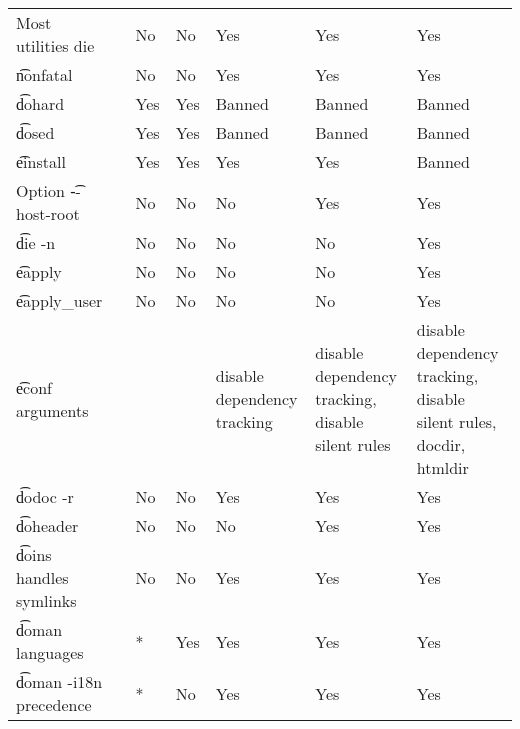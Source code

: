 \begin{landscape}
\begin{longtable}{llP{7.5em}P{7.5em}P{7.5em}P{7.5em}P{7.5em}}
Most utilities die &  &
    No & No & Yes & Yes & Yes \\

\t{nonfatal} &  &
    No & No & Yes & Yes & Yes \\

\t{dohard} &  &
    Yes & Yes & Banned & Banned & Banned \\

\t{dosed} &  &
    Yes & Yes & Banned & Banned & Banned \\

\t{einstall} &  &
    Yes & Yes & Yes & Yes & Banned \\

Option \t{-{}-host-root} &  &
    No & No & No & Yes & Yes \\

\t{die -n} &  &
    No & No & No & No & Yes \\

\t{eapply} &  &
    No & No & No & No & Yes \\

\t{eapply\_user} &  &
    No & No & No & No & Yes \\

\t{econf} arguments &  &
    &  & disable dependency tracking &
    disable dependency tracking, disable silent rules &
    disable dependency tracking, disable silent rules, docdir, htmldir \\

\t{dodoc -r} &  &
    No & No & Yes & Yes & Yes \\

\t{doheader} &  &
    No & No & No & Yes & Yes \\

\t{doins} handles symlinks &  &
    No & No & Yes & Yes & Yes \\

\t{doman} languages &  &
    * & Yes & Yes & Yes & Yes \\

\t{doman -i18n} precedence &  &
    * & No & Yes & Yes & Yes \\


\end{longtable}
\end{landscape}
